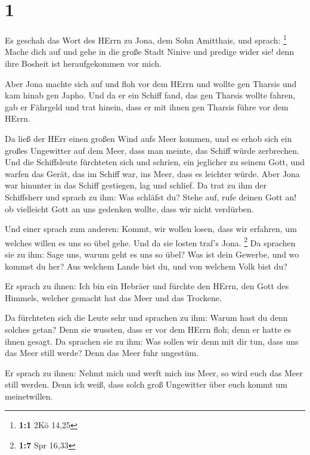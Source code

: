 \hypertarget{section}{%
\section{1}\label{section}}

 Es geschah das Wort des HErrn zu Jona, dem Sohn Amitthais,
und sprach: \footnote{\textbf{1:1} 2Kö 14,25}  Mache dich
auf und gehe in die große Stadt Ninive und predige wider sie! denn ihre
Bosheit ist heraufgekommen vor mich.

 Aber Jona machte sich auf und floh vor dem HErrn und wollte
gen Tharsis und kam hinab gen Japho. Und da er ein Schiff fand, das gen
Tharsis wollte fahren, gab er Fährgeld und trat hinein, dass er mit
ihnen gen Tharsis führe vor dem HErrn.

 Da ließ der HErr einen großen Wind aufs Meer kommen, und es
erhob sich ein großes Ungewitter auf dem Meer, dass man meinte, das
Schiff würde zerbrechen.  Und die Schiffsleute fürchteten
sich und schrien, ein jeglicher zu seinem Gott, und warfen das Gerät,
das im Schiff war, ins Meer, dass es leichter würde. Aber Jona war
hinunter in das Schiff gestiegen, lag und schlief.  Da trat
zu ihm der Schiffsherr und sprach zu ihm: Was schläfst du? Stehe auf,
rufe deinen Gott an! ob vielleicht Gott an uns gedenken wollte, dass wir
nicht verdürben.

 Und einer sprach zum anderen: Kommt, wir wollen losen, dass
wir erfahren, um welches willen es uns so übel gehe. Und da sie losten
traf's Jona. \footnote{\textbf{1:7} Spr 16,33}  Da sprachen
sie zu ihm: Sage uns, warum geht es uns so übel? Was ist dein Gewerbe,
und wo kommst du her? Aus welchem Lande bist du, und von welchem Volk
bist du?

 Er sprach zu ihnen: Ich bin ein Hebräer und fürchte den
HErrn, den Gott des Himmels, welcher gemacht hat das Meer und das
Trockene.

 Da fürchteten sich die Leute sehr und sprachen zu ihm:
Warum hast du denn solches getan? Denn sie wussten, dass er vor dem
HErrn floh; denn er hatte es ihnen gesagt.  Da sprachen sie
zu ihm: Was sollen wir denn mit dir tun, dass uns das Meer still werde?
Denn das Meer fuhr ungestüm.

 Er sprach zu ihnen: Nehmt mich und werft mich ins Meer, so
wird euch das Meer still werden. Denn ich weiß, dass solch groß
Ungewitter über euch kommt um meinetwillen.

